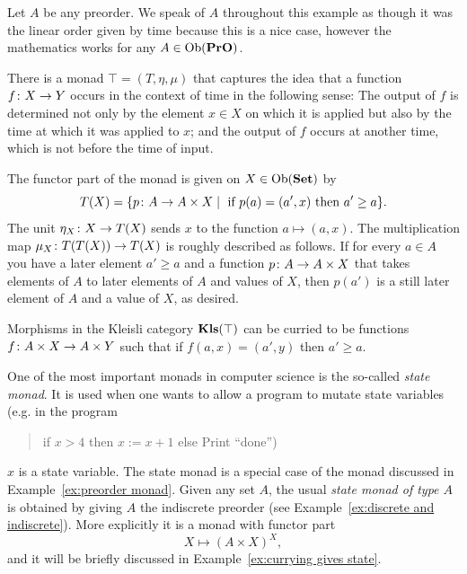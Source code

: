 \documentclass[CT4S-EN-RU]{subfiles}
\begin{document}
\begin{exampleENG}\label{ex:preorder monad}
Let $A$ be any preorder. We speak of $A$ throughout this example as though it was the linear order given by time because this is a nice case, however the mathematics works for any $A\in\textnormal{Ob}({\mathbf{PrO}})$. 

There is a monad $\top=(T,\eta,\mu)$ that captures the idea that a function $f\colon X\rightarrow Y$ occurs in the context of time in the following sense: The output of $f$ is determined not only by the element $x\in X$ on which it is applied but also by the time at which it was applied to $x$; and the output of $f$ occurs at another time, which is not before the time of input.

The functor part of the monad is given on $X\in\textnormal{Ob}({\mathbf{Set}})$ by
$$T(X)=\{p\colon A\rightarrow A\times X{\;|\;}\textnormal{ if } p(a)=(a',x)\textnormal{ then } a'\geq a\}.$$
The unit $\eta_X\colon X\rightarrow T(X)$ sends $x$ to the function $a\mapsto (a,x)$. The multiplication map $\mu_X\colon T(T(X))\rightarrow T(X)$ is roughly described as follows. If for every $a\in A$ you have a later element $a'\geq a$ and a function $p\colon A\rightarrow A\times X$ that takes elements of $A$ to later elements of $A$ and values of $X$, then $p(a')$ is a still later element of $A$ and a value of $X$, as desired.

Morphisms in the Kleisli category ${\mathbf{Kls}}(\top)$ can be curried to be functions $f\colon A\times X\rightarrow A\times Y$ such that if $f(a,x)=(a',y)$ then $a'\geq a$. 
\end{exampleENG}

\begin{exampleRUS}\label{ex:preorder monad}
\end{exampleRUS}

\begin{remarkENG}\label{rem:state monad}
One of the most important monads in computer science is the so-called {\em state monad}. It is used when one wants to allow a program to mutate state variables (e.g. in the program 
\begin{quote}if $x>4$ then $x:=x+1$ else Print “done”)\end{quote}
$x$ is a state variable. The state monad is a special case of the monad discussed in Example~\ref{ex:preorder monad}. Given any set $A$, the usual {\em state monad of type $A$} is obtained by giving $A$ the indiscrete preorder (see Example~\ref{ex:discrete and indiscrete}). More explicitly it is a monad with functor part $$X\mapsto (A\times X)^X,$$ and it will be briefly discussed in Example~\ref{ex:currying gives state}.
\end{remarkENG}
\end{document}
